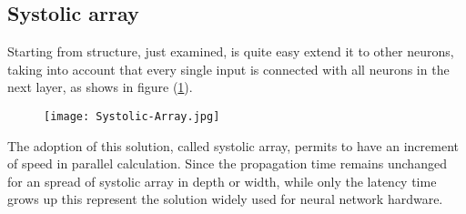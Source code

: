 \subsection{Systolic array}
\label{ssec:hard-systolic-array}
Starting from structure, just examined, is quite easy extend it to other
neurons, taking into account that every single input is connected with all
neurons in the next layer, as shows in figure
(\ref{fig:systolic-array-edge-tpu}).
%
\begin{figure}[htb]
	\centering
	\texttt{[image: Systolic-Array.jpg]}
	\label{fig:systolic-array-edge-tpu}
\end{figure}
%
%
The adoption of this solution, called systolic array, permits to have an
increment of speed in parallel calculation. 
Since the propagation time remains unchanged for an spread of systolic array in
depth or width, while only the latency time grows up this represent the solution
widely used for neural network hardware.
%
%
%
